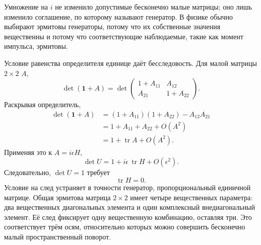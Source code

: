 Умножение на \(i\) не изменило допустимые бесконечно малые матрицы; оно лишь изменило соглашение, по которому называют генератор. В физике обычно выбирают эрмитовы генераторы, потому что их собственные значения вещественны и потому что соответствующие наблюдаемые, такие как момент импульса, эрмитовы.

Условие равенства определителя единице даёт бесследовость. Для малой матрицы \(2\times2\) \(A\),
\begin{equation}
\det(\boldsymbol 1+A)
=
\det
\begin{pmatrix}
1+A_{11}&A_{12}\\
A_{21}&1+A_{22}
\end{pmatrix}.
\end{equation}
Раскрывая определитель,
\begin{align}
\det(\boldsymbol 1+A)
 &=(1+A_{11})(1+A_{22})-A_{12}A_{21}\\
 &=1+A_{11}+A_{22}+O(A^2)\\
 &=1+\operatorname{tr}A+O(A^2).
\end{align}
Применяя это к \(A=i\epsilon H\),
\begin{equation}
\det U=1+i\epsilon\,\operatorname{tr}H+O(\epsilon^2).
\end{equation}
Следовательно, \(\det U=1\) требует
\begin{equation}
\operatorname{tr}H=0.
\end{equation}
Условие на след устраняет в точности генератор, пропорциональный единичной матрице. Общая эрмитова матрица \(2\times2\) имеет четыре вещественных параметра: два вещественных диагональных элемента и один комплексный внедиагональный элемент. Её след фиксирует одну вещественную комбинацию, оставляя три. Это соответствует трём осям, относительно которых можно совершить бесконечно малый пространственный поворот.

